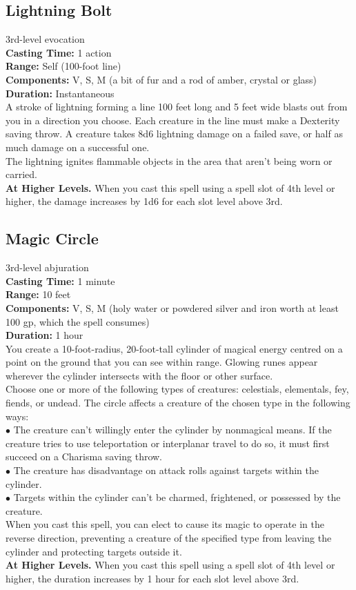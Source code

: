 \documentclass[11pt, A4paper, english]{article}
\begin{document}
		\subsection{Lightning Bolt}
3rd-level evocation \\
\textbf{Casting Time:} 1 action \\
\textbf{Range:} Self (100-foot line) \\
\textbf{Components:} V, S, M (a bit of fur and a rod of amber, crystal or glass) \\
\textbf{Duration:} Instantaneous \\
A stroke of lightning forming a line 100 feet long and 5 feet wide blasts out from you in a direction you choose. Each creature in the line must make a Dexterity saving throw. A creature takes 8d6 lightning damage on a failed save, or half as much damage on a successful one. \\
The lightning ignites flammable objects in the area that aren't being worn or carried. \\
\textbf{At Higher Levels.} When you cast this spell using a spell slot of 4th level or higher, the damage increases by 1d6 for each slot level above 3rd.

		\subsection{Magic Circle}
3rd-level abjuration \\
\textbf{Casting Time:} 1 minute \\
\textbf{Range:} 10 feet \\
\textbf{Components:} V, S, M (holy water or powdered silver and iron worth at least 100 gp, which the spell consumes) \\
\textbf{Duration:} 1 hour \\
You create a 10-foot-radius, 20-foot-tall cylinder of magical energy centred on a point on the ground that you can see within range. Glowing runes appear wherever the cylinder intersects with the floor or other surface. \\
Choose one or more of the following types of creatures: celestials, elementals, fey, fiends, or undead. The circle affects a creature of the chosen type in the following ways: \\
$\bullet$ The creature can't willingly enter the cylinder by nonmagical means. If the creature tries to use teleportation or interplanar travel to do so, it must first succeed on a Charisma saving throw. \\
$\bullet$ The creature has disadvantage on attack rolls against targets within the cylinder. \\
$\bullet$ Targets within the cylinder can’t be charmed, frightened, or possessed by the creature. \\
When you cast this spell, you can elect to cause its magic to operate in the reverse direction, preventing a creature of the specified type from leaving the cylinder and protecting targets outside it. \\
\textbf{At Higher Levels.} When you cast this spell using a spell slot of 4th level or higher, the duration increases by 1 hour for each slot level above 3rd.
\end{document}
